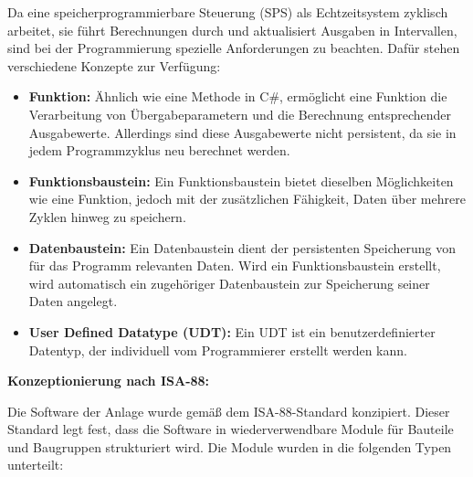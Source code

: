 Da eine speicherprogrammierbare Steuerung (SPS) als Echtzeitsystem zyklisch arbeitet, sie führt 
Berechnungen durch und aktualisiert Ausgaben in Intervallen, sind bei der Programmierung spezielle Anforderungen 
zu beachten. Dafür stehen verschiedene Konzepte zur Verfügung:

\begin{itemize}
    \item \textbf{Funktion:} Ähnlich wie eine Methode in C\#, ermöglicht eine Funktion die Verarbeitung von Übergabeparametern 
    und die Berechnung entsprechender Ausgabewerte. Allerdings sind diese Ausgabewerte nicht persistent, da sie in jedem 
    Programmzyklus neu berechnet werden.
    \item \textbf{Funktionsbaustein:} Ein Funktionsbaustein bietet dieselben Möglichkeiten wie eine Funktion, jedoch mit der 
    zusätzlichen Fähigkeit, Daten über mehrere Zyklen hinweg zu speichern.
    \item \textbf{Datenbaustein:} Ein Datenbaustein dient der persistenten Speicherung von für das Programm relevanten Daten. 
    Wird ein Funktionsbaustein erstellt, wird automatisch ein zugehöriger Datenbaustein zur Speicherung seiner Daten angelegt.
    \item \textbf{User Defined Datatype (UDT):} Ein UDT ist ein benutzerdefinierter Datentyp, der individuell vom 
    Programmierer erstellt werden kann.
\end{itemize}

\textbf{Konzeptionierung nach ISA-88:}

Die Software der Anlage wurde gemäß dem ISA-88-Standard konzipiert. Dieser Standard legt fest, dass die Software in 
wiederverwendbare Module für Bauteile und Baugruppen strukturiert wird. Die Module wurden in die folgenden Typen unterteilt:

